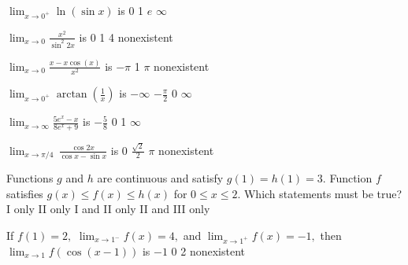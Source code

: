\begin{question}
\(\lim_{x \to 0^+} \ln(\sin x)\) is 
\choicesline
{\ans{\(-\infty\)}}
{0}
{1}
{\(e\)}
{\(\infty\)}
\end{question}

\begin{question}
\(\lim_{x \to 0} \frac{x^2}{\sin^2 2x}\) is 
\choicesline
{0}
{}
{1}
{4}
{nonexistent}
\end{question}

\begin{question}
\(\lim_{x \to 0} \frac{x - x\cos(x)}{x^2}\) is 
\choicesline
{\(-\pi\)}
{}
{1}
{\(\pi\)}
{nonexistent}
\end{question}

\begin{question}
\(\lim_{x \to 0^+} \arctan \left(\frac{1}{x}\right)\) is 
\choicesline
{\(-\infty\)}
{\(-\frac{\pi}{2}\)}
{0}
{}
{\(\infty\)}
\end{question}

\begin{question}
\(\lim_{x \to \infty} \frac{5e^{x} - x}{8e^{x} + 9}\) is 
\choicesline
{\(-\frac{5}{8}\)}
{0}
{}
{1}
{\(\infty\)}
\end{question}

\begin{question}
\(\lim_{x \to \pi/4} \, \frac{\cos 2x}{\cos x - \sin x}\) is 
\choicesline
{0}
{\(\frac{\sqrt 2}{2}\)}
{}
{\(\pi\)}
{nonexistent}
\end{question}

\begin{question}
Functions \(g\) and \(h\) are continuous and satisfy \(g(1) = h(1) = 3.\) Function \(f\) satisfies \(g(x) \leqslant f(x) \leqslant h(x)\) for \(0 \leqslant x \leqslant 2.\) 
Which statements must be true?
\choices
{I only}
{II only}
{I and II only}
{II and III only}
{}
\end{question}

\begin{question}
If \(f(1) = 2,\) \(\lim_{x \to 1^-} f(x) = 4,\) and \(\lim_{x \to 1^+} f(x) = -1,\) then \(\lim_{x \to 1} f(\cos(x - 1))\) is 
\choicesline
{\(-1\)}
{0}
{2}
{}
{nonexistent}
\end{question}


